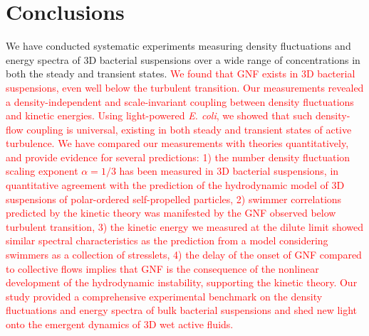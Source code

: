 \documentclass[twocolumn,aps,prx,amsmath,amssymb,longbibliography,superscriptaddress]{revtex4-2}
\begin{document}
\section{Conclusions}

We have conducted systematic experiments measuring density fluctuations and energy spectra of 3D bacterial suspensions over a wide range of concentrations in both the steady and transient states.
\textcolor{red}{We found that GNF exists in 3D bacterial suspensions, even well below the turbulent transition. Our measurements revealed a density-independent and scale-invariant coupling between density fluctuations and kinetic energies. Using light-powered \textit{E. coli}, we showed that such density-flow coupling is universal, existing in both steady and transient states of active turbulence. We have compared our measurements with theories quantitatively, and provide evidence for several predictions:
1) the number density fluctuation scaling exponent $\alpha=1/3$ has been measured in 3D bacterial suspensions, in quantitative agreement with the prediction of the hydrodynamic model of 3D suspensions of polar-ordered self-propelled particles,
2) swimmer correlations predicted by the kinetic theory was manifested by the GNF observed below turbulent transition,
3) the kinetic energy we measured at the dilute limit showed similar spectral characteristics as the prediction from a model considering swimmers as a collection of stresslets, %
4) the delay of the onset of GNF compared to collective flows implies that GNF is the consequence of the nonlinear development of the hydrodynamic instability, supporting the kinetic theory. Our study provided a comprehensive experimental benchmark on the density fluctuations and energy spectra of bulk bacterial suspensions and shed new light onto the emergent dynamics of 3D wet active fluids.}
\end{document}
